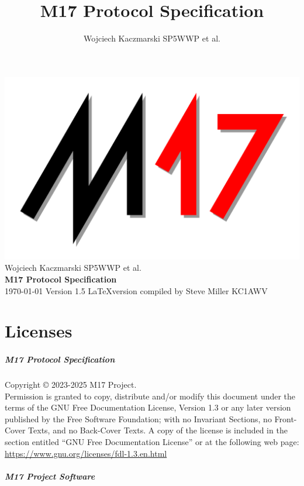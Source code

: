 \documentclass[a4paper,11pt,oneside]{book}
\title{M17 Protocol Specification}
\author{Wojciech Kaczmarski SP5WWP et al.}
\makeatletter
\renewcommand{\frontmatter}{\cleardoublepage\@mainmatterfalse}
\makeatother
\begin{document}
\begin{titlepage}
	\raggedleft
	\includegraphics[width=0.7\linewidth,right]{img/m17_logo_shadow}
	\vspace*{\baselineskip}
	{\Large Wojciech Kaczmarski SP5WWP et al.} \\
	\vspace*{0.167\textheight}
	\textbf{\LARGE M17 Protocol Specification} \\
	\today
	\vfill
	{\large Version 1.5}
	\vfill
	\LaTeX version compiled by Steve Miller KC1AWV
\end{titlepage}

\frontmatter

\tableofcontents

\listoftables

\listoffigures

\chapter{Licenses}

\paragraph{M17 Protocol Specification}

Copyright \copyright{}  2023-2025  M17 Project. \\

Permission is granted to copy, distribute and/or modify this document under the terms of the GNU Free Documentation License, Version 1.3 or any later version published by the Free Software Foundation; with no Invariant Sections, no Front-Cover Texts, and no Back-Cover Texts. A copy of the license is included in the section entitled ``GNU Free Documentation License'' or at the following web page: \href{https://www.gnu.org/licenses/fdl-1.3.en.html}{https://www.gnu.org/licenses/fdl-1.3.en.html}

\paragraph{M17 Project Software}
\end{document}
